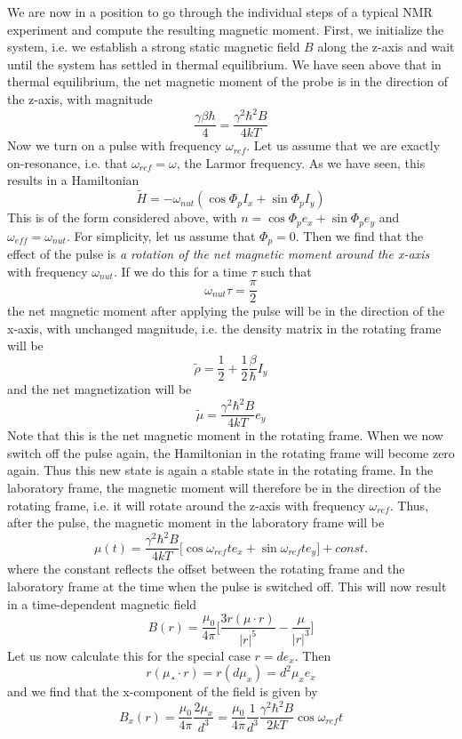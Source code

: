 \documentclass[a4paper, draft]{article}
\theoremstyle{own}
\theoremstyle{remark}
\begin{document}
We are now in a position to go through the individual steps of a typical NMR experiment and compute the resulting magnetic moment. First, we initialize the system, i.e. we establish a strong static magnetic field $B$ along the z-axis and wait until the system has settled in thermal equilibrium. We have seen above that in thermal equilibrium, the net magnetic moment of the probe is in the direction of the z-axis, with magnitude
$$
\frac{\gamma \beta \hbar}{4} = \frac{\gamma^2 \hbar^2 B}{4kT} 
$$
Now we turn on a pulse with frequency $\omega_{ref}$. Let us assume that we are exactly on-resonance, i.e. that $\omega_{ref} = \omega$, the Larmor frequency. As we have seen, this results in a Hamiltonian
$$
\widetilde{H} = - \omega_{nut} ( \cos \Phi_p I_x + \sin \Phi_p I_y)
$$
This is of the form considered above, with $n = \cos \Phi_p e_x + \sin \Phi_p e_y$ and $\omega_{eff} = \omega_{nut}$. For simplicity, let us assume that $\Phi_p = 0$. Then we find that the effect of the pulse is {\it a rotation of the net magnetic moment around the x-axis} with frequency $\omega_{nut}$. If we do this for a time $\tau$ such that
$$
\omega_{nut} \tau = \frac{\pi}{2}
$$
the net magnetic moment after applying the pulse will be in the direction of the x-axis, with unchanged magnitude, i.e. the density matrix in the rotating frame will be
$$
\widetilde{\rho} = \frac{1}{2} + \frac{1}{2} \frac{\beta}{\hbar} I_y
$$
and the net magnetization will be 
$$
\tilde{\mu} = \frac{\gamma^2 \hbar^2 B}{4kT}  e_y
$$
Note that this is the net magnetic moment in the rotating frame. When we now switch off the pulse again, the Hamiltonian in the rotating frame will become zero again. Thus this new state is again a stable state in the rotating frame. In the laboratory frame, the magnetic moment will therefore be in the direction of the rotating frame, i.e. it will rotate around the z-axis with frequency $\omega_{ref}$. Thus, after the pulse, the magnetic moment in the laboratory frame will be
$$
\mu(t) = \frac{\gamma^2 \hbar^2 B}{4kT}  \big[ \cos \omega_{ref} t e_x + \sin \omega_{ref}t e_y \big] + const.
$$
where the constant reflects the offset between the rotating frame and the laboratory frame at the time when the pulse is switched off.
This will now result in a time-dependent magnetic field
$$
B(r) = \frac{\mu_0}{4\pi} \big[  \frac{3r(\mu \cdot r)}{|r|^5} - \frac{\mu}{|r|^3}\big] 
$$
Let us now calculate this for the special case $r = d e_x$. Then 
$$
r  (\mu ¸\cdot r) = r  (d \mu_x) = d^2 \mu_x e_x
$$
and we find that the x-component of the field is given by
$$
B_x(r) = \frac{\mu_0}{4\pi} \frac{2 \mu_x}{d^3} 
=
\frac{\mu_0}{4\pi} \frac{1}{d^3} 
\frac{\gamma^2 \hbar^2 B}{2kT}
\cos \omega_{ref} t
$$
\end{document}
